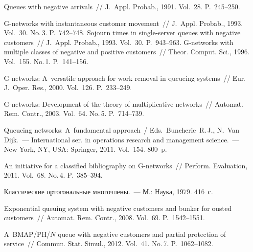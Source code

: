  \begin{multicols}{2}

\renewcommand{\bibname}{\protect\rmfamily Литература}

{\small\frenchspacing
{%
\begin{thebibliography}{99}
 Queues with negative arrivals~// 
J.~Appl. Probab., 1991. Vol.~28. P.~245--250.

G-networks with instantaneous customer movement~// J.~Appl. Probab., 1993. 
Vol.~30. No.\,3. P.~742--748.
Sojourn times in single-server queues with negative customers~// 
{J.~Appl. Probab.}, 1993. Vol.~30. P.~943--963.
G-networks with multiple classes of negative and positive customers~// 
Theor. Comput. Sci., 1996. Vol.~155. No.\,1. P.~141--156.

 G-networks: A~versatile approach for work removal in queueing systems~// 
Eur. J.~Oper. Res., 2000. Vol.~126. P.~233--249.

G-networks: Development of the theory of multiplicative networks~// 
Automat. Rem. Contr., 2003. Vol.~64. No.\,5. P.~714--739.

Queueing networks: A~fundamental approach~/
Eds.\ Buncherie~R.\,J., N.~Van Dijk.~--- 
International ser. in operations research and management science.~---
New York, NY, USA: Springer, 2011.  Vol.~154. 800~p.

 An initiative for a classified bibliography on G-networks~// 
{Perform. Evaluation}, 2011. Vol.~68. No.\,4. P.~385--394.

 Классические ортогональные многочлены.~---
М.: Наука, 1979. 416~с.







Exponential queuing system with negative customers and bunker for ousted customers~// 
{Automat. Rem. Contr.}, 2008. 
Vol.~69. P.~1542--1551.

 A~BMAP/PH/$N$ queue with negative customers and partial protection of service~//
{Commun. Stat. Simul.}, 2012. Vol.~41. No.\,7. P.~1062--1082.


\end{thebibliography}}}
\end{multicols}
